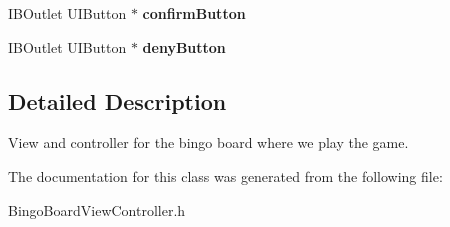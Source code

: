 \begin{DoxyCompactItemize}
\item 
\hypertarget{interface_bingo_board_view_controller_a6e1d9862da0d4a5d0bddec1f34be1a44}{I\+B\+Outlet U\+I\+Button $\ast$ {\bfseries confirm\+Button}}\label{interface_bingo_board_view_controller_a6e1d9862da0d4a5d0bddec1f34be1a44}

\item 
\hypertarget{interface_bingo_board_view_controller_a0b4fdf0f28c6d826cb1b8ba6bb24f5ee}{I\+B\+Outlet U\+I\+Button $\ast$ {\bfseries deny\+Button}}\label{interface_bingo_board_view_controller_a0b4fdf0f28c6d826cb1b8ba6bb24f5ee}

\end{DoxyCompactItemize}


\subsection{Detailed Description}
View and controller for the bingo board where we play the game. 

The documentation for this class was generated from the following file\+:\begin{DoxyCompactItemize}
\item 
Bingo\+Board\+View\+Controller.\+h\end{DoxyCompactItemize}
